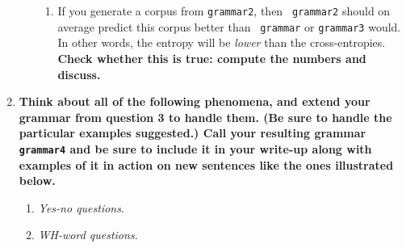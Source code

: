 \documentclass[10pt]{article}
\begin{document}
\begin{enumerate}
\begin{enumerate}
\begin{enumerate}
\item If you generate a corpus from {\tt grammar2}, then {\tt
    grammar2} should on average predict this corpus better than {\tt
    grammar} or {\tt grammar3} would. In other words, the entropy will
  be {\it lower} than the cross-entropies. {\bf Check whether this is true:
    compute the numbers and discuss.} \end{enumerate}
\end{enumerate}

\item  {\bf Think about all of the following phenomena, and extend your grammar
  from question 3 to handle them. (Be sure to handle the particular
  examples suggested.)  Call your resulting grammar
  \verb|grammar4| and be sure to include it in your write-up along with examples of it
  in action on new sentences like the ones illustrated below.}

\begin{enumerate}
\item {\it Yes-no questions}.

\item {\it WH-word questions.} 

\end{enumerate}
\end{enumerate}
\end{document}
